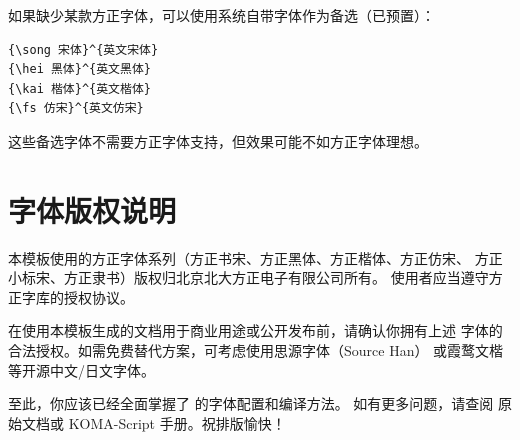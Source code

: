 如果缺少某款方正字体，可以使用系统自带字体作为备选（已预置）：

\begin{lstlisting}[style=kaolstplain]
% 系统自带宋体、黑体、楷体、仿宋作为备选
{\song 宋体}^{英文宋体}
{\hei 黑体}^{英文黑体}
{\kai 楷体}^{英文楷体}
{\fs 仿宋}^{英文仿宋}
\end{lstlisting}

这些备选字体不需要方正字体支持，但效果可能不如方正字体理想。


\section{字体版权说明}


\begin{kaobox}[title=字体版权]
本模板使用的方正字体系列（方正书宋、方正黑体、方正楷体、方正仿宋、
方正小标宋、方正隶书）版权归北京北大方正电子有限公司所有。
使用者应当遵守方正字库的授权协议。

在使用本模板生成的文档用于商业用途或公开发布前，请确认你拥有上述
字体的合法授权。如需免费替代方案，可考虑使用思源字体（Source Han）
或霞鹜文楷等开源中文/日文字体。
\end{kaobox}

至此，你应该已经全面掌握了  的字体配置和编译方法。
如有更多问题，请查阅  原始文档或 KOMA-Script 手册。祝排版愉快！
